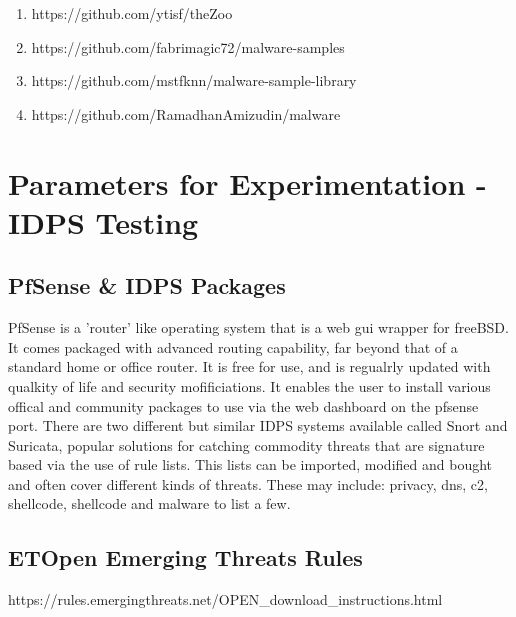 \begin{enumerate}
    \item https://github.com/ytisf/theZoo
    \item https://github.com/fabrimagic72/malware-samples
    \item https://github.com/mstfknn/malware-sample-library
    \item https://github.com/RamadhanAmizudin/malware
\end{enumerate}



\chapter{Parameters for Experimentation - IDPS Testing}

\section{PfSense \& IDPS Packages}
PfSense is a 'router' like operating system that is a web gui wrapper for freeBSD. It comes packaged with advanced routing capability, far beyond that of a standard home or office router. It is free for use, and is regualrly updated with qualkity of life and security mofificiations.
It enables the user to install various offical and community packages to use via the web dashboard on the pfsense port. There are two different but similar IDPS systems available called Snort and Suricata, popular solutions for catching commodity threats that are signature based via the use of rule lists.
This lists can be imported, modified and bought and often cover different kinds of threats. These may include: privacy, dns, c2, shellcode, shellcode and malware to list a few.

\section{ETOpen Emerging Threats Rules}
https://rules.emergingthreats.net/OPEN_download_instructions.html

